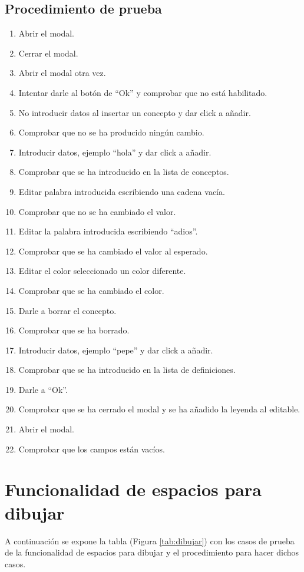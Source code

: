 \subsection{Procedimiento de prueba}
\label{procedimientoPruebas:leyenda}
\begin{enumerate}
\item Abrir el modal.
\item Cerrar el modal.
\item Abrir el modal otra vez.
\item Intentar darle al botón de ``Ok'' y comprobar que no está habilitado.
\item No introducir datos al insertar un concepto y dar click a añadir.
\item Comprobar que no se ha producido ningún cambio.
\item Introducir datos, ejemplo ``hola'' y dar click a añadir.
\item Comprobar que se ha introducido en la lista de conceptos.
\item Editar palabra introducida escribiendo una cadena vacía.
\item Comprobar que no se ha cambiado el valor.
\item Editar la palabra introducida escribiendo ``adios''.
\item Comprobar que se ha cambiado el valor al esperado.
\item Editar el color seleccionado un color diferente.
\item Comprobar que se ha cambiado el color.
\item Darle a borrar el concepto.
\item Comprobar que se ha borrado.
\item Introducir datos, ejemplo ``pepe'' y dar click a añadir.
\item Comprobar que se ha introducido en la lista de definiciones.
\item Darle a ``Ok''.
\item Comprobar que se ha cerrado el modal y se ha añadido la leyenda al editable.
\item Abrir el modal.
\item Comprobar que los campos están vacíos.
\end{enumerate}

\section{Funcionalidad de espacios para dibujar}
\label{planPruebas:dibujar}
A continuación se expone la tabla (Figura \ref{tab:dibujar}) con los casos de prueba de la funcionalidad de espacios para dibujar y el procedimiento para hacer dichos casos.

